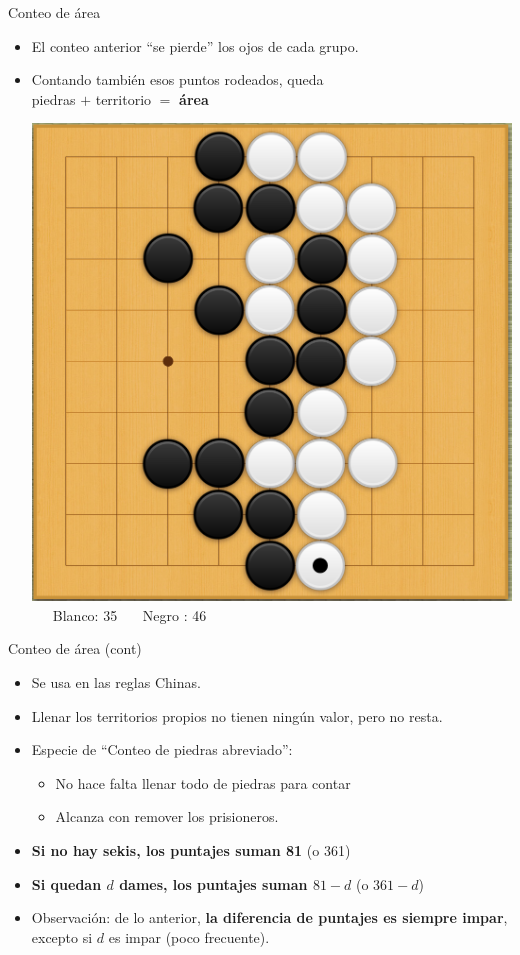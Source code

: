 \documentclass{beamer}
\begin{document}
\begin{frame}{Conteo de área}
  
  \begin{itemize}
    \item El conteo anterior ``se pierde'' los ojos de cada grupo.
    \item Contando también esos puntos rodeados, queda\\ {\hfill piedras $+$ territorio $=$ \textbf{área} \hfill}
    
    \includegraphics[scale=0.17]{ejemplo-conteo.png} \ \ \ Blanco: 35 \ \ \ Negro : 46  
  \end{itemize}
  
\end{frame}

\begin{frame}{Conteo de área (cont)}
  
  \begin{itemize}
    \item Se usa en las reglas Chinas.
    \item Llenar los territorios propios no tienen ningún valor, pero no resta.
    \item Especie de ``Conteo de piedras abreviado'': 
       \begin{itemize}
           \item No hace falta llenar todo de piedras para contar
           \item Alcanza con remover los prisioneros.
       \end{itemize}
    \item \textbf{Si no hay sekis, los puntajes suman 81} (o 361)
    \item \textbf{Si quedan $d$ dames,  los puntajes suman $81 - d$} (o $361 - d$)
    \item Observación: de lo anterior, \textbf{la diferencia de puntajes es siempre impar}, excepto si $d$ es impar (poco frecuente).
  \end{itemize}
  
\end{frame}
\end{document}

